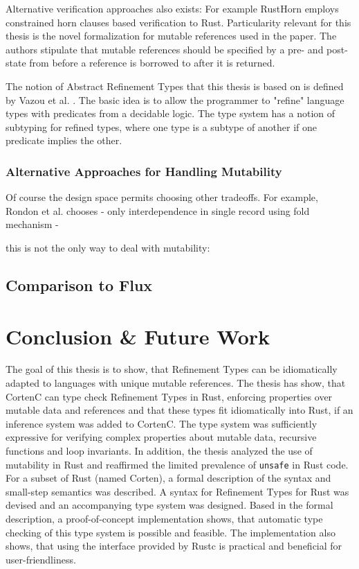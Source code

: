 \documentclass{book}
\newcommand{\code}[1]{\texttt{#1}}
\theoremstyle{definition}
\begin{document}
Alternative verification approaches also exists: For example RustHorn\cite{matsushita_rusthorn_2020} employs constrained horn clauses based verification to Rust. Particularity relevant for this thesis is the novel formalization for mutable references used in the paper. The authors stipulate that mutable references should be specified by a pre- and post-state from before a reference is borrowed to after it is returned.

The notion of Abstract Refinement Types that this thesis is based on is defined by Vazou et al. \cite{vazou_abstract_2013}. The basic idea is to allow the programmer to "refine" language types with predicates from a decidable logic. The type system has a notion of subtyping for refined types, where one type is a subtype of another if one predicate implies the other.

\label{subsec:related-work-mutability} \subsection{Alternative Approaches for Handling Mutability}

Of course the design space permits choosing other tradeoffs. For example, Rondon et al. \cite{rondon_low-level_2010} chooses 
  - only interdependence in single record using fold mechanism
  - 

this is not the only way to deal with mutability: 

\section{Comparison to Flux}

\chapter{Conclusion \& Future Work}

The goal of this thesis is to show, that Refinement Types can be idiomatically adapted to languages with unique mutable references. 
The thesis has show, that CortenC can type check Refinement Types in Rust, enforcing properties over mutable data and references and that these types fit idiomatically into Rust, if an inference system was added to CortenC.
The type system was sufficiently expressive for verifying complex properties about mutable data, recursive functions and loop invariants. 
In addition, the thesis analyzed the use of mutability in Rust and reaffirmed the limited prevalence of \code{unsafe} in Rust code.
For a subset of Rust (named Corten), a formal description of the syntax and small-step semantics was described.
A syntax for Refinement Types for Rust was devised and an accompanying type system was designed.
Based in the formal description, a proof-of-concept implementation shows, that automatic type checking of this type system is possible and feasible. The implementation also shows, that using the interface provided by Rustc is practical and beneficial for user-friendliness.
\end{document}
